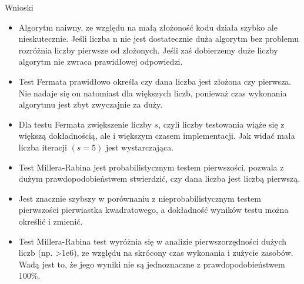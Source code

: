 \documentclass[11pt]{article}
\providecommand{\tightlist}{%
      \setlength{\itemsep}{0pt}\setlength{\parskip}{0pt}}
\begin{document}
\begin{section}{Metoda Miler-Rabina}
\begin{Verbatim}[commandchars=\\\{\}]
   n = 1302227338984882027682141097
   k = 10000
   Mean exec. time of is\_prime\_miller\_rabin:        0.000333547592163
   Std. of the exec. time of is\_prime\_miller\_rabin: 0.000471707528534
   Result (is prime): False
   
   n = 6570165603886230104742488179045
   k = 10000
   Mean exec. time of is\_prime\_miller\_rabin:        0.000000000000000
   Std. of the exec. time of is\_prime\_miller\_rabin: 0.000000000000000
   Result (is prime): False
   
   n = 4547337172376300111955330758342147474062293202868155909393
   k = 10000
   Mean exec. time of is\_prime\_miller\_rabin:        0.000000000000000
   Std. of the exec. time of is\_prime\_miller\_rabin: 0.000000000000000
   Result (is prime): False
   
   
       \end{Verbatim}
   
       \hypertarget{textbfconclusions}{%
   
   \begin{enumerate}
   \def\labelenumi{\arabic{enumi}.}
   \tightlist
   \end{enumerate}
   
    \end{section}



    \vspace{450px}
\begin{section}{Wnioski}
\begin{itemize}
    \item Algorytm naiwny, ze względu na małą złożoność kodu działa szybko ale nieskutecznie. Jeśli liczba n nie jest dostatecznie duża algorytm bez problemu rozróżnia liczby pierwsze od złożonych. Jeśli zaś dobierzemy duże liczby algorytm nie zwraca prawidłowej odpowiedzi.
    \item Test Fermata prawidłowo określa czy dana liczba jest złożona czy pierwsza. Nie nadaje się on natomiast dla większych liczb, ponieważ czas wykonania algorytmu jest zbyt zwyczajnie za duży.
    \item Dla testu Fermata zwiększenie liczby $s$, czyli liczby testowania wiąże się z większą dokładnością, ale i większym czasem implementacji. Jak widać mała liczba iteracji $(s=5)$ jest wystarczająca.
    \item
     Test Millera-Rabina jest probabilistycznym testem pierwszości, pozwala
     z dużym prawdopodobieństwem stwierdzić, czy dana liczba jest liczbą
     pierwszą. 
   \item Jest znacznie szybszy w porównaniu z nieprobabilistycznym
     testem pierwszości pierwiastka kwadratowego, a dokładność wyników
     testu można określić i zmienić. 
   \item Test Millera-Rabina test wyróżnia się w analizie
     pierwszorzędności dużych liczb (np. \textgreater1e6), ze względu na
     skrócony czas wykonania i zużycie zasobów. Wadą jest to, że jego wyniki nie są jednoznaczne z prawdopodobieństwem 100\%.
\end{itemize}

\end{section}  
    
\end{document}
